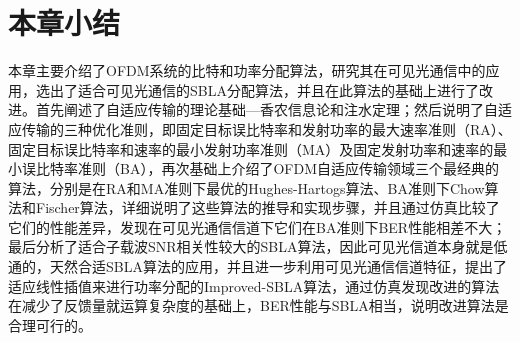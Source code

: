 \section{本章小结}
本章主要介绍了OFDM系统的比特和功率分配算法，研究其在可见光通信中的应用，选出了适合可见光通信的SBLA分配算法，并且在此算法的基础上进行了改进。首先阐述了自适应传输的理论基础—香农信息论和注水定理；然后说明了自适应传输的三种优化准则，即固定目标误比特率和发射功率的最大速率准则（RA）、固定目标误比特率和速率的最小发射功率准则（MA）及固定发射功率和速率的最小误比特率准则（BA），再次基础上介绍了OFDM自适应传输领域三个最经典的算法，分别是在RA和MA准则下最优的Hughes-Hartogs算法、BA准则下Chow算法和Fischer算法，详细说明了这些算法的推导和实现步骤，并且通过仿真比较了它们的性能差异，发现在可见光通信信道下它们在BA准则下BER性能相差不大；最后分析了适合子载波SNR相关性较大的SBLA算法，因此可见光信道本身就是低通的，天然合适SBLA算法的应用，并且进一步利用可见光通信信道特征，提出了适应线性插值来进行功率分配的Improved-SBLA算法，通过仿真发现改进的算法在减少了反馈量就运算复杂度的基础上，BER性能与SBLA相当，说明改进算法是合理可行的。

